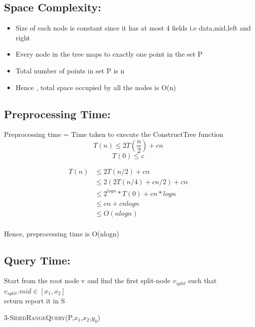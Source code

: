 \documentclass[11pt]{article}
\begin{document}
\subsection*{Space Complexity:}  
\begin{itemize}
\item Size of each node is constant since it has at most 4 fields i.e data,mid,left and right
\item Every node in the tree maps to exactly one point in the set P
\item Total number of points in set P is n
\item Hence , total space occupied by all the nodes is O(n)
\end{itemize}

\subsection*{Preprocessing Time:}

Preprocessing time = Time taken to execute the ConstructTree function
\[T(n) \leq 2T(\frac{n}{2}) + cn \]
\[T(0) \leq c\]

\begin{align*}
T(n) & \leq 2T(n/2) + cn \\
&\leq 2(2T(n/4) + cn/2) + cn \\
&\leq 2^{logn} * T(0) + cn * logn \\
&\leq cn + cnlogn   \\
&\leq O(nlogn) \\
\end{align*}


Hence, preprocessing time is O(nlogn)

\subsection*{Query Time:}

\begin{algorithm}
Start from the root node v and find the first split-node $v_{split}$ such that $v_{split}.mid \in [x_1,x_2]$
 { \\
\Indp
{} {return \;}
{report it in S \;
 \;
 \;
\Indm
}
}
\caption{\textsc{3-SidedRangeQuery}(P,$x_1$,$x_2$,$y_0$)}
\end{algorithm}
\end{document}
